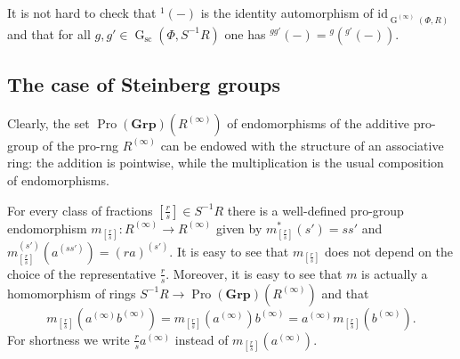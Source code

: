 \documentclass[oneside, 11pt]{amsart}
\numberwithin{equation}{section}
\theoremstyle{definition}
\theoremstyle{remark}
\DeclareMathOperator\GG{G}
\DeclareMathOperator{\Pro}{Pro}
\newcommand{\Group}{\mathbf{Grp}}
\newcommand{\up}[2]{{^{#1}\!{#2}}}
\begin{document}
It is not hard to check that $\up 1{(-)}$ is the identity automorphism of $\mathrm{id}_{\GG^{(\infty)}(\Phi, R)}$ and that for all \(g, g' \in \GG_{\mathrm{sc}}(\Phi, S^{-1} R)\) one has $\up{gg'}{(-)} = \up{g}{(\up{g'}{(-)})}$.

\subsection{The case of Steinberg groups}
Clearly, the set $\Pro(\Group)(R^{(\infty)})$ of endomorphisms of the additive pro-group of the pro-rng $R^{(\infty)}$ can be endowed with the structure of an associative ring: the addition is 
pointwise, while the multiplication is the usual composition of endomorphisms.

For every class of fractions \([\frac rs] \in S^{-1} R\) there is a well-defined pro-group endomorphism \(m_{[\frac rs]} \colon R^{(\infty)} \to R^{(\infty)}\) given by \(m_{[\frac rs]}^*(s') = ss'\) and \(m_{[\frac rs]}^{(s')}(a^{(ss')}) = (ra)^{(s')}\). It is easy to see that $m_{[\frac{r}{s}]}$ does not depend on the choice of the representative \(\tfrac r s\). Moreover, it is easy to see that \(m\) is actually a homomorphism of rings \(S^{-1} R \to \Pro(\Group)(R^{(\infty)})\) and that 
\begin{equation} \label{eq:m-mult} m_{[\frac rs]}(a^{(\infty)} b^{(\infty)}) = m_{[\frac rs]}(a^{(\infty)}) b^{(\infty)} = a^{(\infty)} m_{[\frac rs]}(b^{(\infty)}).\end{equation}
For shortness we write \(\frac rs a^{(\infty)}\) instead of \(m_{[\frac rs]}(a^{(\infty)})\). 
\end{document}
